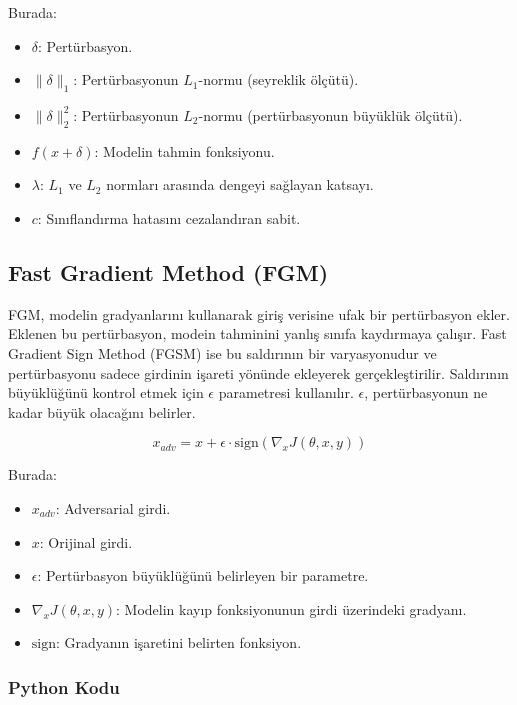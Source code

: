 Burada:

\begin{itemize}
    \item $\delta$: Pertürbasyon.
    \item $\|\delta\|_1$: Pertürbasyonun $L_1$-normu (seyreklik ölçütü).
    \item $\|\delta\|_2^2$: Pertürbasyonun $L_2$-normu (pertürbasyonun büyüklük ölçütü).
    \item $f(x + \delta)$: Modelin tahmin fonksiyonu.
    \item $\lambda$: $L_1$ ve $L_2$ normları arasında dengeyi sağlayan katsayı.
    \item $c$: Sınıflandırma hatasını cezalandıran sabit.
\end{itemize}

\newpage

\subsection{Fast Gradient Method (FGM)}

FGM, modelin gradyanlarını kullanarak giriş verisine ufak bir pertürbasyon ekler. Eklenen bu pertürbasyon, modein tahminini yanlış sınıfa kaydırmaya çalışır. Fast Gradient Sign Method (FGSM) ise bu saldırının bir varyasyonudur ve pertürbasyonu sadece girdinin işareti yönünde ekleyerek gerçekleştirilir. Saldırının büyüklüğünü kontrol etmek için $\epsilon$ parametresi kullanılır. $\epsilon$, pertürbasyonun ne kadar büyük olacağını belirler.

\[ x_{adv} = x + \epsilon \cdot \text{sign}(\nabla_x J(\theta, x, y)) \]

Burada:

\begin{itemize}
    \item $x_{adv}$: Adversarial girdi.
    \item $x$: Orijinal girdi.
    \item $\epsilon$: Pertürbasyon büyüklüğünü belirleyen bir parametre.
    \item $\nabla_x J(\theta, x, y)$: Modelin kayıp fonksiyonunun girdi üzerindeki gradyanı.
    \item $\text{sign}$: Gradyanın işaretini belirten fonksiyon.
\end{itemize}

\subsubsection{Python Kodu}

